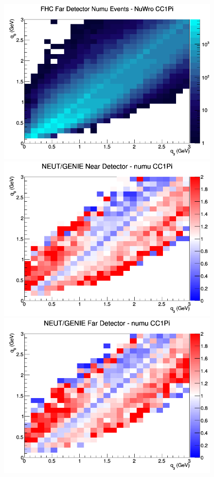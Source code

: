 \documentclass[12pt]{article}
\begin{document}
\begin{figure}[h]
\endminipage
{}
\includegraphics[width=\linewidth]{eff_q0_q3/FGT/CC1Pi_FHC_FD_numu_q3_q0_NuWro.png}
\endminipage
\newline
{}
\includegraphics[width=\linewidth]{eff_q0_q3/FGT/ratios/CC1Pi_NEUT_GENIE_numu_near_q3_q0.png}
\endminipage
{}
\includegraphics[width=\linewidth]{eff_q0_q3/FGT/ratios/CC1Pi_NEUT_GENIE_numu_far_q3_q0.png}

\end{figure}
\end{document}
